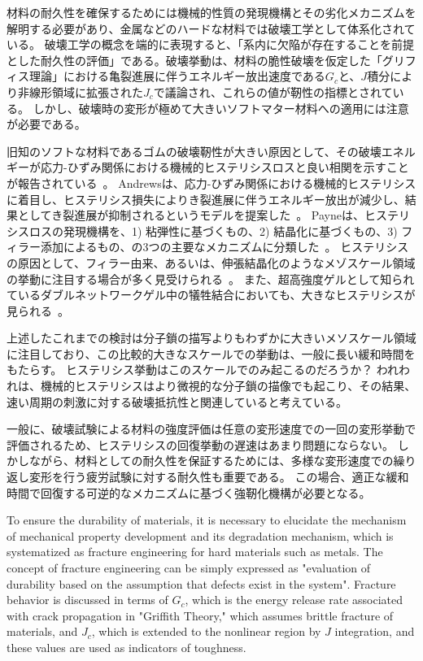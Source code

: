\documentclass[uplatex,dvipdfmx,a4paper,10pt]{jsarticle}
\makeatletter
\def\subsection{\@startsection{subsection}{2}{\z@}{0.2\Cvs \@plus.5\Cdp \@minus.2\Cdp}{0.1\Cvs \@plus.3\Cdp}{\reset@font\normalsize\bfseries}}
\makeatother
\begin{document}
\subsection{力学的ヒステリシスの重要性}

材料の耐久性を確保するためには機械的性質の発現機構とその劣化メカニズムを解明する必要があり、金属などのハードな材料では破壊工学として体系化されている。
破壊工学の概念を端的に表現すると、「系内に欠陥が存在することを前提とした耐久性の評価」である。破壊挙動は、材料の脆性破壊を仮定した「グリフィス理論」における亀裂進展に伴うエネルギー放出速度である$G_c$と、$J$積分により非線形領域に拡張された$J_c$で議論され、これらの値が靭性の指標とされている。
しかし、破壊時の変形が極めて大きいソフトマター材料への適用には注意が必要である。

旧知のソフトな材料であるゴムの破壊靭性が大きい原因として、その破壊エネルギーが応力-ひずみ関係における機械的ヒステリシスロスと良い相関を示すことが報告されている~\cite{payne1}。
Andrewsは、応力-ひずみ関係における機械的ヒステリシスに着目し、ヒステリシス損失によりき裂進展に伴うエネルギー放出が減少し、結果としてき裂進展が抑制されるというモデルを提案した~\cite{Andrews}。
Payneは、ヒステリシスロスの発現機構を、1) 粘弾性に基づくもの、2) 結晶化に基づくもの、3) フィラー添加によるもの、の3つの主要なメカニズムに分類した~\cite{payne2}。
ヒステリシスの原因として、フィラー由来、あるいは、伸張結晶化のようなメゾスケール領域の挙動に注目する場合が多く見受けられる~\cite{zhang, Igarashi2013}。
また、超高強度ゲルとして知られているダブルネットワークゲル中の犠牲結合においても、大きなヒステリシスが見られる~\cite{Gong2010}。

上述したこれまでの検討は分子鎖の描写よりもわずかに大きいメソスケール領域に注目しており、この比較的大きなスケールでの挙動は、一般に長い緩和時間をもたらす。
ヒステリシス挙動はこのスケールでのみ起こるのだろうか？
われわれは、機械的ヒステリシスはより微視的な分子鎖の描像でも起こり、その結果、速い周期の刺激に対する破壊抵抗性と関連していると考えている。

一般に、破壊試験による材料の強度評価は任意の変形速度での一回の変形挙動で評価されるため、ヒステリシスの回復挙動の遅速はあまり問題にならない。
しかしながら、材料としての耐久性を保証するためには、多様な変形速度での繰り返し変形を行う疲労試験に対する耐久性も重要である。
この場合、適正な緩和時間で回復する可逆的なメカニズムに基づく強靭化機構が必要となる。


To ensure the durability of materials, it is necessary to elucidate the mechanism of mechanical property development and its degradation mechanism, which is systematized as fracture engineering for hard materials such as metals.
The concept of fracture engineering can be simply expressed as "evaluation of durability based on the assumption that defects exist in the system". Fracture behavior is discussed in terms of $G_c$, which is the energy release rate associated with crack propagation in "Griffith Theory," which assumes brittle fracture of materials, and $J_c$, which is extended to the nonlinear region by $J$ integration, and these values are used as indicators of toughness.
\end{document}
